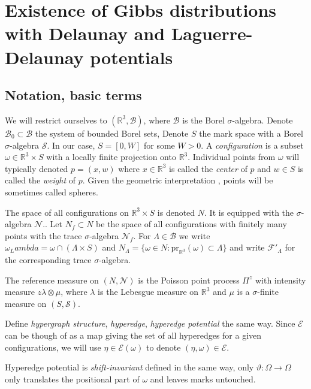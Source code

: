 \documentclass[12pt,a4paper]{report}
\newcommand{\R}{\mathbb R^3}
\begin{document}
\chapter{Existence of Gibbs distributions with Delaunay and Laguerre-Delaunay potentials}

\section{Notation, basic terms}
We will restrict ourselves to $(\mathbb R^3, \mathcal B)$, where $\mathcal B$ is the Borel $\sigma$-algebra. Denote $\mathcal B_0 \subset \mathcal B$ the system of bounded Borel sets, Denote $S$ the mark space with a Borel $\sigma$-algebra $\mathcal S$. In our case, $S = [0,W]$ for some $W>0$. A \textit{configuration} is a subset $\omega \in \mathbb R^3\times S$ with a locally finite projection onto $\mathbb R^3$. Individual points from $\omega$ will typically denoted $p=(x,w)$ where $x \in \mathbb R^3$ is called the \textit{center} of $p$ and $w \in S$ is called the \textit{weight} of $p$. Given the geometric interpretation , points will be sometimes called spheres.

The space of all configurations on $\mathbb R^3 \times S$ is denoted $N$. It is equipped with the $\sigma$-algebra $\mathcal N$.. Let $N_f \subset N$ be the space of all configurations with finitely many points with the trace $\sigma$-algebra $\mathcal N_f$. For $\Lambda\in\mathcal B$ we write $\omega_Lambda = \omega \cap (\Lambda \times S)$ and $N_\Lambda = \{\omega \in N: \text{pr}_{\R} (\omega) \subset \Lambda\}$ and write $\mathcal F'_\Lambda$ for the corresponding trace $\sigma$-algebra.

The reference measure on $(N, \mathcal N)$ is the Poisson point process $\Pi^z$ with intensity measure $z\lambda \otimes \mu$, where $\lambda$ is the Lebesgue measure on $\mathbb R^3$ and $\mu$ is a $\sigma$-finite measure on $(S,\mathcal S)$.


Define \textit{hypergraph structure}, \textit{hyperedge}, \textit{hyperedge potential} the same way. Since $\mathcal E$ can be though of as a map giving the set of all hyperedges for a given configurations, we will use $\eta \in \mathcal E(\omega)$ to denote $(\eta,\omega)\in\mathcal E$.

Hyperedge potential is \textit{shift-invariant} defined in the same way, only $\vartheta:\Omega \to \Omega$ only translates the positional part of $\omega$ and leaves marks untouched.
\end{document}
